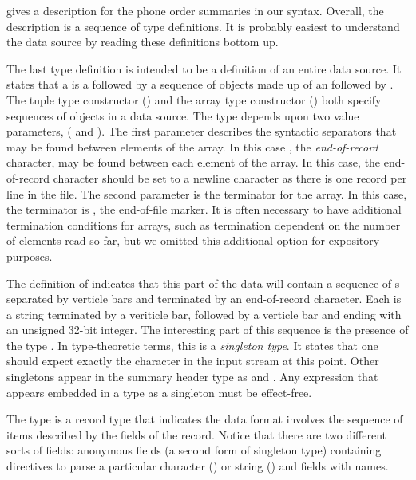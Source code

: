  gives a \datatype{} description for the
\dibbler{} phone order summaries in our syntax.  Overall, the description 
is a sequence of type definitions.  It is probably
easiest to understand the data source by reading these definitions
bottom up.

The last type definition  is intended to be a definition of
an entire \dibbler{} data source.  It states that a
 is a  followed by a sequence of
objects made up of an  followed by .  The
tuple type constructor () and the array type constructor
() both specify sequences of objects in a data
source.  The  type depends upon two value parameters,
( and ).  The first parameter describes the syntactic
separators that may be found between elements of the array.  In this
case , the {\em end-of-record} character, may be found 
between each element
of the array.  In this case, the end-of-record character 
should be set to a newline character as there is one record per
line in the file.   
The second parameter is the
terminator for the array.  In this case, the terminator is , the
end-of-file marker.  It is often necessary to have additional
termination conditions for arrays, such as termination dependent on
the number of elements read so far, but we omitted this additional option 
for expository purposes.

The definition of  indicates that this part of the
\dibbler{} data will contain a sequence of s separated by
verticle bars and terminated by an end-of-record character.  
Each  is a
string terminated by a veriticle bar, followed by a verticle bar and
ending with an unsigned 32-bit integer.  The interesting part of this
sequence is the presence of the type .  In type-theoretic
terms, this is a {\em singleton type}.  It states that one should
expect exactly the character  in the input stream at this
point.  Other singletons appear in the summary header type as
 and .  Any expression that appears embedded in a type
as a singleton must be effect-free.

The type  is a record type that indicates
the data format involves the sequence of items described by
the fields of the record.  Notice that there are two different
sorts of fields: anonymous fields (a second form of singleton type) 
containing directives to parse a particular character () or
string ()
and fields with names.  


